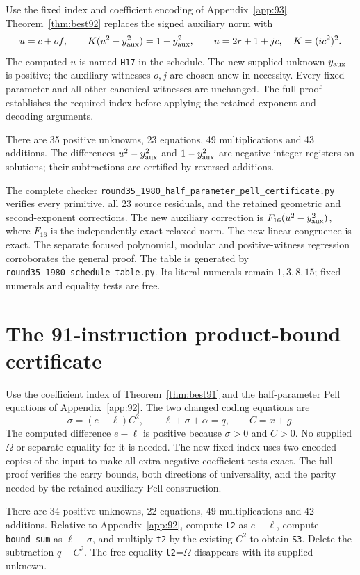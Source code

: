 \documentclass[11pt,letterpaper]{article}
\theoremstyle{definition}
\theoremstyle{remark}
\numberwithin{equation}{section}
\newcommand{\file}[1]{\texttt{#1}}
\begin{document}
Use the fixed index and coefficient encoding of Appendix~\ref{app:93}.
Theorem~\ref{thm:best92} replaces the signed auxiliary norm with
\[
 u=c+of,\qquad K(u^2-y_{\rm aux}^2)=1-y_{\rm aux}^2,
 \qquad u=2r+1+jc,\quad K=(ic^2)^2.
\]
The computed $u$ is named \texttt{H17} in the schedule. The new
supplied unknown $y_{\rm aux}$ is positive; the auxiliary witnesses
$o,j$ are chosen anew in necessity. Every fixed parameter and all
other canonical witnesses are unchanged. The full proof establishes
the required index before applying the retained exponent and decoding
arguments.

There are 35 positive unknowns, 23 equations, 49 multiplications and
43 additions. The differences $u^2-y_{\rm aux}^2$ and
$1-y_{\rm aux}^2$ are negative integer registers on solutions; their
subtractions are certified by reversed additions.

The complete checker
\file{round35\_1980\_half\_parameter\_pell\_certificate.py}
verifies every primitive, all 23 source residuals, and the retained
geometric and second-exponent corrections. The new auxiliary
correction is $F_{16}(u^2-y_{\rm aux}^2)$, where $F_{16}$ is the
independently exact relaxed norm. The new linear congruence is exact.
The separate focused polynomial, modular and positive-witness
regression corroborates the general proof. The table is generated by
\file{round35\_1980\_schedule\_table.py}. Its literal numerals
remain $1,3,8,15$; fixed numerals and equality tests are free.

\small


\clearpage\normalsize
\section{The 91-instruction product-bound certificate}\label{app:91}

Use the coefficient index of Theorem~\ref{thm:best91} and the
half-parameter Pell equations of Appendix~\ref{app:92}. The two changed
coding equations are
\[
 \sigma=(e-\ell)C^2,\qquad \ell+\sigma+\alpha=q,
 \qquad C=x+g.
\]
The computed difference $e-\ell$ is positive because $\sigma>0$ and
$C>0$. No supplied $\Omega$ or separate equality for it is needed.
The new fixed index uses two encoded copies of the input to make all
extra negative-coefficient tests exact. The full proof verifies the
carry bounds, both directions of universality, and the parity needed
by the retained auxiliary Pell construction.

There are 34 positive unknowns, 22 equations, 49 multiplications and
42 additions. Relative to Appendix~\ref{app:92}, compute
\texttt{t2} as $e-\ell$, compute \texttt{bound\_sum} as
$\ell+\sigma$, and multiply \texttt{t2} by the existing $C^2$ to
obtain \texttt{S3}. Delete the subtraction $q-C^2$. The free equality
\texttt{t2}=$\Omega$ disappears with its supplied unknown.
\end{document}
